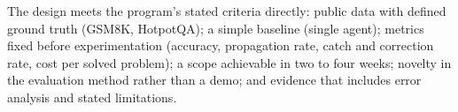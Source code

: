 \documentclass{article}
\begin{document}
The design meets the program's stated criteria directly: public data with
defined ground truth (GSM8K, HotpotQA); a simple baseline (single agent);
metrics fixed before experimentation (accuracy, propagation rate, catch and
correction rate, cost per solved problem); a scope achievable in two to four
weeks; novelty in the evaluation method rather than a demo; and evidence that
includes error analysis and stated limitations.



\end{document}
